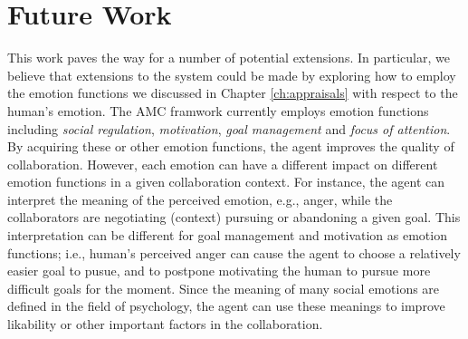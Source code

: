 \documentclass[12pt]{report}
\begin{document}

\section{Future Work}

This work paves the way for a number of potential extensions. In
particular, we believe that extensions to the system could be made by exploring
how to employ the emotion functions we discussed in Chapter \ref{ch:appraisals}
with respect to the human's emotion. The AMC framwork currently employs emotion
functions including \textit{social regulation}, \textit{motivation}, \textit{goal
management} and \textit{focus of attention}. By acquiring these or other emotion
functions, the agent improves the quality of collaboration. However, each
emotion can have a different impact on different emotion functions in a given
collaboration context. For instance, the agent can interpret the meaning of the
perceived emotion, e.g., anger, while the collaborators are negotiating
(context) pursuing or abandoning a given goal. This interpretation can be
different for goal management and motivation as emotion functions; i.e., human's
perceived anger can cause the agent to choose a relatively easier goal to pusue,
and to postpone motivating the human to pursue more difficult goals for the
moment. Since the meaning of many social emotions are defined in the field of
psychology, the agent can use these meanings to improve likability or other
important factors in the collaboration.
\end{document}
